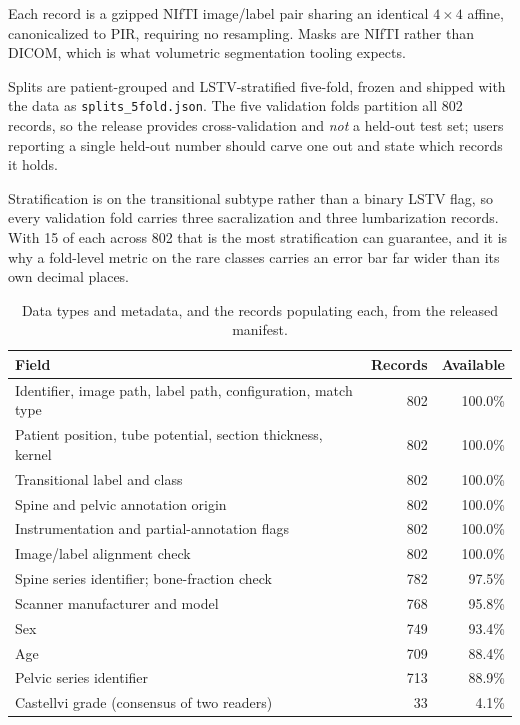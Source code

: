 \documentclass[aapm,mph,amsmath,amssymb,reprint]{revtex4-2}
\begin{document}
Each record is a gzipped NIfTI image/label pair sharing an identical $4\times4$ affine,
canonicalized to PIR, requiring no resampling. Masks are NIfTI rather than DICOM, which is what volumetric segmentation tooling expects.

Splits are patient-grouped and LSTV-stratified five-fold, frozen and shipped with the data
as \texttt{splits\_5fold.json}. The five validation folds partition all 802 records, so the
release provides cross-validation and \emph{not} a held-out test set; users reporting a
single held-out number should carve one out and state which records it holds.

Stratification is on the transitional subtype rather than a binary LSTV flag, so every validation fold carries three sacralization and three lumbarization records. With 15 of
each across 802 that is the most stratification can guarantee, and it is why a fold-level
metric on the rare classes carries an error bar far wider than its own decimal places.

\begin{table}[t]
\caption{\label{tab:completeness}Data types and metadata, and the records populating
each, from the released manifest.}
\begin{ruledtabular}
\begin{tabular}{lrr}
Field & Records & Available \\
\hline
Identifier, image path, label path, configuration, match type & 802 & 100.0\% \\
Patient position, tube potential, section thickness, kernel & 802 & 100.0\% \\
Transitional label and class & 802 & 100.0\% \\
Spine and pelvic annotation origin & 802 & 100.0\% \\
Instrumentation and partial-annotation flags & 802 & 100.0\% \\
Image/label alignment check & 802 & 100.0\% \\
Spine series identifier; bone-fraction check & 782 & 97.5\% \\
Scanner manufacturer and model & 768 & 95.8\% \\
Sex & 749 & 93.4\% \\
Age & 709 & 88.4\% \\
Pelvic series identifier & 713 & 88.9\% \\
Castellvi grade (consensus of two readers) & 33 & 4.1\% \\
\end{tabular}
\end{ruledtabular}
\end{table}
\end{document}
